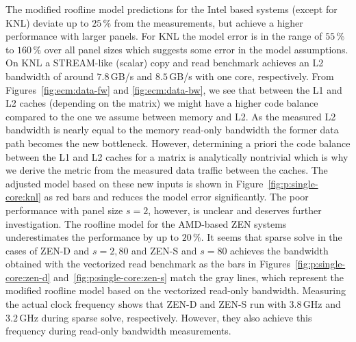 The modified roofline model predictions for the Intel based systems (except for
KNL) deviate up to $25$\,\% from the measurements, but achieve a higher
performance with larger panels.
%
For KNL the model error is in the range of $55\,\%$ to $160\,\%$ over all panel
sizes which suggests some error in the model assumptions.
On KNL a STREAM-like (scalar) copy and read benchmark achieves an L2 bandwidth of
around $7.8$\,GB/s and $8.5$\,GB/s with one core,
respectively.
From Figures~\ref{fig:ecm:data-fw} and \ref{fig:ecm:data-bw}, we see that between the L1 and L2 caches (depending on
the matrix) we might have a higher code
balance compared to the one we assume between memory and L2.
As the measured L2 bandwidth is nearly equal to the memory read-only bandwidth
the former data path becomes the new bottleneck.
However, determining a priori the code balance between the L1 and L2 caches for a matrix
is analytically nontrivial which is why we derive the metric from the measured data
traffic between the caches.
The adjusted model based on these new inputs is shown in
Figure~\ref{fig:p:single-core:knl} as red bars and reduces the model error
significantly.
%
The poor performance with panel size $s = 2$, however, is unclear and deserves
further investigation. 
%
%
%
The roofline model for the AMD-based ZEN systems underestimates the
performance by up to $20\,\%$.
It seems that sparse solve in the cases of ZEN-D and $s=2, 80$ and ZEN-S and $s=80$
achieves the bandwidth obtained with the vectorized read benchmark as the bars
in Figures~\ref{fig:p:single-core:zen-d} and~\ref{fig:p:single-core:zen-s} match
the gray lines, which represent the modified roofline model based on the
vectorized read-only bandwidth.
Measuring the actual clock frequency shows that ZEN-D and ZEN-S run with
$3.8$\,GHz and $3.2$\,GHz during sparse solve, respectively.
However, they also achieve this frequency during read-only bandwidth
measurements.
%

